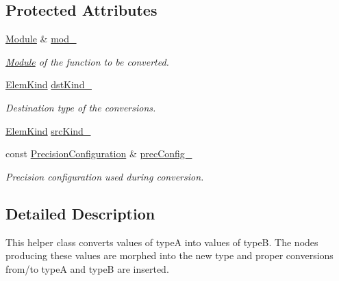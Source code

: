 \subsection*{Protected Attributes}
\begin{DoxyCompactItemize}
\item 
\mbox{\label{classglow_1_1_type_a_to_type_b_function_converter_af9add479a1efeded2312a89022fbf646}} 
\hyperlink{classglow_1_1_module}{Module} \& \hyperlink{classglow_1_1_type_a_to_type_b_function_converter_af9add479a1efeded2312a89022fbf646}{mod\+\_\+}
\begin{DoxyCompactList}\small\item\em \hyperlink{classglow_1_1_module}{Module} of the function to be converted. \end{DoxyCompactList}\item 
\mbox{\label{classglow_1_1_type_a_to_type_b_function_converter_a9266924eca2508219f507ddc52992c1b}} 
\hyperlink{namespaceglow_ab92e14a94329daf4083db670e95fbcdf}{Elem\+Kind} \hyperlink{classglow_1_1_type_a_to_type_b_function_converter_a9266924eca2508219f507ddc52992c1b}{dst\+Kind\+\_\+}
\begin{DoxyCompactList}\small\item\em Destination type of the conversions. \end{DoxyCompactList}\item 
\hyperlink{namespaceglow_ab92e14a94329daf4083db670e95fbcdf}{Elem\+Kind} \hyperlink{classglow_1_1_type_a_to_type_b_function_converter_a984bdf4b025f79a0bee38afb767cd8bd}{src\+Kind\+\_\+}
\item 
\mbox{\label{classglow_1_1_type_a_to_type_b_function_converter_abe2a27823fd414025534b3879ff3b35d}} 
const \hyperlink{structglow_1_1_precision_configuration}{Precision\+Configuration} \& \hyperlink{classglow_1_1_type_a_to_type_b_function_converter_abe2a27823fd414025534b3879ff3b35d}{prec\+Config\+\_\+}
\begin{DoxyCompactList}\small\item\em Precision configuration used during conversion. \end{DoxyCompactList}\end{DoxyCompactItemize}


\subsection{Detailed Description}
This helper class converts values of typeA into values of typeB. The nodes producing these values are morphed into the new type and proper conversions from/to typeA and typeB are inserted. 

